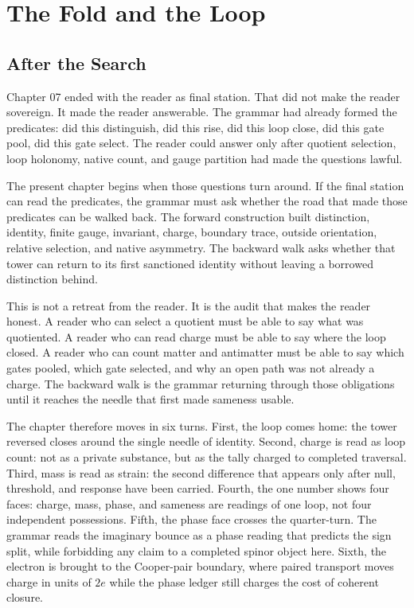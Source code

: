 \chapter{The Fold and the Loop}
\label{chap:backward-walk-cooper-pair-ledger}

\section{After the Search}

Chapter 07 ended with the reader as final station. That did not make the
reader sovereign. It made the reader answerable. The grammar had already
formed the predicates: did this distinguish, did this rise, did this loop
close, did this gate pool, did this gate select. The reader could answer
only after quotient selection, loop holonomy, native count, and gauge
partition had made the questions lawful.

The present chapter begins when those questions turn around. If the final
station can read the predicates, the grammar must ask whether the road that
made those predicates can be walked back. The forward construction built
distinction, identity, finite gauge, invariant, charge, boundary trace,
outside orientation, relative selection, and native asymmetry. The backward
walk asks whether that tower can return to its first sanctioned identity
without leaving a borrowed distinction behind.

This is not a retreat from the reader. It is the audit that makes the reader
honest. A reader who can select a quotient must be able to say what was
quotiented. A reader who can read charge must be able to say where the loop
closed. A reader who can count matter and antimatter must be able to say
which gates pooled, which gate selected, and why an open path was not
already a charge. The backward walk is the grammar returning through those
obligations until it reaches the needle that first made sameness usable.

The chapter therefore moves in six turns. First, the loop comes home: the
tower reversed closes around the single needle of identity. Second, charge
is read as loop count: not as a private substance, but as the tally charged
to completed traversal. Third, mass is read as strain: the second difference
that appears only after null, threshold, and response have been carried.
Fourth, the one number shows four faces: charge, mass, phase, and sameness
are readings of one loop, not four independent possessions. Fifth, the phase
face crosses the quarter-turn. The grammar reads the imaginary bounce as a
phase reading that predicts the sign split, while forbidding any claim to a
completed spinor object here. Sixth, the electron is brought
to the Cooper-pair boundary, where paired transport moves charge in units of
\(2e\) while the phase ledger still charges the cost of coherent closure.

